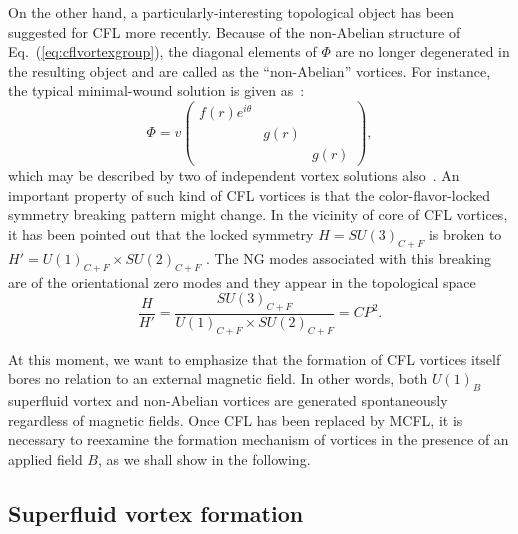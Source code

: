 \documentclass[prd, showpacs,nofootinbib,amsmath,amssymb]{revtex4}
\begin{document}
On the other hand, a particularly-interesting topological object has been suggested for
CFL more recently. Because of the non-Abelian structure of Eq.~(\ref{eq:cflvortexgroup}), the
diagonal elements of $\Phi$ are no longer degenerated in the resulting object and are called as
the ``non-Abelian'' vortices. For instance, the typical minimal-wound solution is given
as~\cite{nakano2008non,eto2009color}:
\begin{equation}
  \label{eq:nvortex}
  \Phi = v\begin{pmatrix}
   f(r)e^{i\theta} & & \\ & g(r) & \\ & & g(r)
  \end{pmatrix},
\end{equation}
which may be described by two of independent vortex solutions also~\cite{balachandran2006semisuperfluid}.
An important property of such kind of CFL vortices
%
is that the color-flavor-locked symmetry breaking pattern might change. In the vicinity of core of CFL
vortices, it has been pointed out that the locked symmetry $H={SU(3)_{C+F}}$ is broken to
$H' =U(1)_{C+F} \times SU(2)_{C+F}$ \cite{nakano2008non,vinci2012spontaneous}.
The NG modes associated with this breaking are of the orientational zero modes and they appear in the
topological space
\begin{equation}
  \label{eq:cp2}
 \frac{H}{H'} = \frac{SU(3)_{C+F}}{U(1)_{C+F} \times SU(2)_{C+F}} = CP^2.
\end{equation}

At this moment, we want to emphasize that the formation of CFL vortices itself bores no relation to an
external magnetic field. In other words, both $U(1)_{B}$ superfluid vortex and non-Abelian vortices are
generated spontaneously regardless of magnetic fields.
Once CFL has been replaced by MCFL, it is necessary to reexamine the formation mechanism of vortices in
the presence of an applied field $B$, as we shall show in the following.

\subsection{Superfluid vortex formation }
\label{sssec:4}
\end{document}
